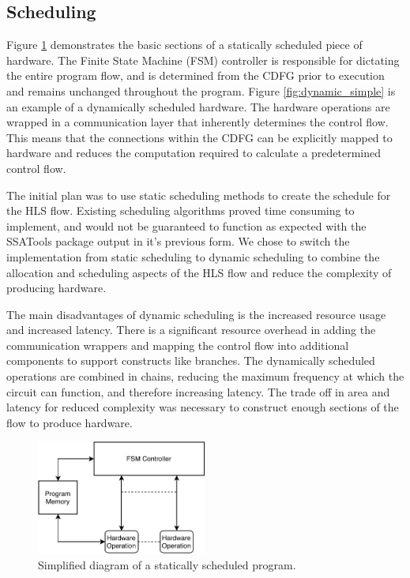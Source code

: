 \subsection{Scheduling}
Figure \ref{fig:static_simple} demonstrates the basic sections of a statically scheduled piece of hardware. The Finite State Machine (FSM) controller is responsible for dictating the entire program flow, and is determined from the CDFG prior to execution and remains unchanged throughout the program. Figure \ref{fig:dynamic_simple} is an example of a dynamically scheduled hardware. The hardware operations are wrapped in a communication layer that inherently determines the control flow. This means that the connections within the CDFG can be explicitly mapped to hardware and reduces the computation required to calculate a predetermined control flow. 

The initial plan was to use static scheduling methods to create the schedule for the HLS flow. Existing scheduling algorithms proved time consuming to implement, and would not be guaranteed to function as expected with the SSATools package output in it's previous form. We chose to switch the implementation from static scheduling to dynamic scheduling to combine the allocation and scheduling aspects of the HLS flow and reduce the complexity of producing hardware.

The main disadvantages of dynamic scheduling is the increased resource usage and increased latency. There is a significant resource overhead in adding the communication wrappers and mapping the control flow into additional components to support constructs like branches. The dynamically scheduled operations are combined in chains, reducing the maximum frequency at which the circuit can function, and therefore increasing latency. The trade off in area and latency for reduced complexity was necessary to construct enough sections of the flow to produce hardware.

\begin{figure}[htb!]
    \centering
    \includegraphics[width=0.5\textwidth]{Images/oversimplified_static.pdf}
    \caption{Simplified diagram of a statically scheduled program.}
    \label{fig:static_simple}
\end{figure}


